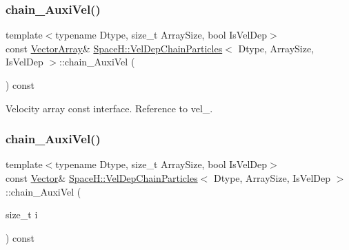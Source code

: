 \mbox{\label{class_space_h_1_1_vel_dep_chain_particles_ab2ec7493ee6cb12ed77f6aac4f4e8660}} 
\subsubsection{\texorpdfstring{chain_\+Auxi\+Vel()}{chainAuxiVel()}\hspace{0.1cm}{\footnotesize\ttfamily [1/4]}}
{\footnotesize\ttfamily template$<$typename Dtype, size\+\_\+t Array\+Size, bool Is\+Vel\+Dep$>$ \\
const \mbox{\hyperlink{class_space_h_1_1_vel_indep_particles_aa9983058940249df8b00fa800e8cbad2}{Vector\+Array}}\& \mbox{\hyperlink{class_space_h_1_1_vel_dep_chain_particles}{Space\+H\+::\+Vel\+Dep\+Chain\+Particles}}$<$ Dtype, Array\+Size, Is\+Vel\+Dep $>$\+::chain_\+Auxi\+Vel (\begin{DoxyParamCaption}{ }\end{DoxyParamCaption}) const\hspace{0.3cm}{\ttfamily [inline]}}



Velocity array const interface. Reference to vel\+\_\+. 

\mbox{\label{class_space_h_1_1_vel_dep_chain_particles_a1f717dd8619e3237362bacd55623500c}} 
\subsubsection{\texorpdfstring{chain_\+Auxi\+Vel()}{chainAuxiVel()}\hspace{0.1cm}{\footnotesize\ttfamily [2/4]}}
{\footnotesize\ttfamily template$<$typename Dtype, size\+\_\+t Array\+Size, bool Is\+Vel\+Dep$>$ \\
const \mbox{\hyperlink{class_space_h_1_1_vel_indep_particles_a61bbcfdb0dc7f99f3c68af69a755c935}{Vector}}\& \mbox{\hyperlink{class_space_h_1_1_vel_dep_chain_particles}{Space\+H\+::\+Vel\+Dep\+Chain\+Particles}}$<$ Dtype, Array\+Size, Is\+Vel\+Dep $>$\+::chain_\+Auxi\+Vel (\begin{DoxyParamCaption}\item[{size\+\_\+t}]{i }\end{DoxyParamCaption}) const\hspace{0.3cm}{\ttfamily [inline]}}



